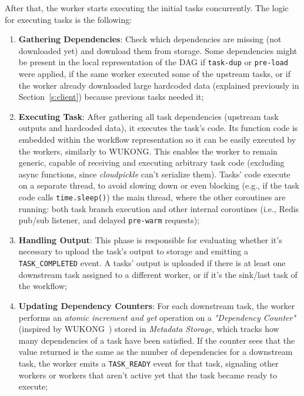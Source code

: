 \documentclass[conference]{IEEEtran}
\begin{document}
After that, the worker starts executing the initial tasks concurrently. The logic for executing tasks is the following:
\begin{enumerate}
    \item \textbf{Gathering Dependencies}: Check which dependencies are missing (not downloaded yet) and download them from storage. Some dependencies might be present in the local representation of the DAG if \texttt{task-dup} or \texttt{pre-load} were applied, if the same worker executed some of the upstream tasks, or if the worker already downloaded large hardcoded data (explained previously in Section~\ref{s:client}) because previous tasks needed it;
    \item \textbf{Executing Task}: After gathering all task dependencies (upstream task outputs and hardcoded data), it executes the task's code. Its function code is embedded within the workflow representation so it can be easily executed by the workers, similarly to WUKONG. This enables the worker to remain generic, capable of receiving and executing arbitrary task code (excluding async functions, since \textit{cloudpickle} can't serialize them). Tasks' code execute on a separate thread, to avoid slowing down or even blocking (e.g., if the task code calls \texttt{time.sleep()}) the main thread, where the other coroutines are running: both task branch execution and other internal coroutines (i.e., Redis pub/sub listener, and delayed \texttt{pre-warm} requests);
    \item \textbf{Handling Output}: This phase is responsible for evaluating whether it's necessary to upload the task's output to storage and emitting a \texttt{TASK\_COMPLETED} event. A tasks' output is uploaded if there is at least one downstream task assigned to a different worker, or if it's the sink/last task of the workflow;
    \item \textbf{Updating Dependency Counters}: For each downstream task, the worker performs an \textit{atomic increment and get} operation on a \textit{"Dependency Counter"} (inspired by WUKONG~\cite{wukong_2}) stored in \textit{Metadata Storage}, which tracks how many dependencies of a task have been satisfied. If the counter sees that the value returned is the same as the number of dependencies for a downstream task, the worker emits a \texttt{TASK\_READY} event for that task, signaling other workers or workers that aren't active yet that the task became ready to execute;

\end{enumerate}
\end{document}
